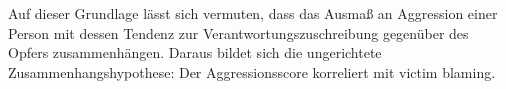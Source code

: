 Auf dieser Grundlage lässt sich vermuten, dass das Ausmaß an Aggression einer Person mit dessen Tendenz zur Verantwortungszuschreibung gegenüber des Opfers zusammenhängen. Daraus bildet sich die ungerichtete Zusammenhangshypothese: Der Aggressionsscore korreliert mit victim blaming.


